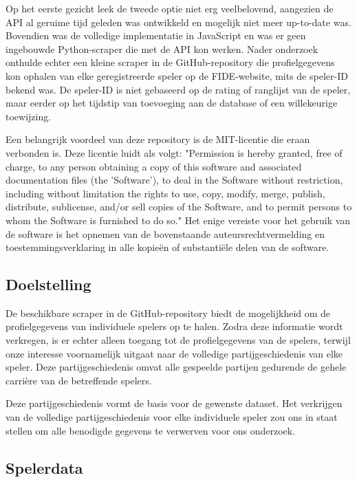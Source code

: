 Op het eerste gezicht leek de tweede optie niet erg veelbelovend, aangezien de API al geruime tijd geleden was ontwikkeld en mogelijk niet meer up-to-date was. Bovendien was de volledige implementatie in JavaScript en was er geen ingebouwde Python-scraper die met de API kon werken. Nader onderzoek onthulde echter een kleine scraper in de GitHub-repository die profielgegevens kon ophalen van elke geregistreerde speler op de FIDE-website, mits de speler-ID bekend was. De speler-ID is niet gebaseerd op de rating of ranglijst van de speler, maar eerder op het tijdstip van toevoeging aan de database of een willekeurige toewijzing.

Een belangrijk voordeel van deze repository is de MIT-licentie die eraan verbonden is. Deze licentie luidt als volgt: "Permission is hereby granted, free of charge, to any person obtaining a copy of this software and associated documentation files (the 'Software'), to deal in the Software without restriction, including without limitation the rights to use, copy, modify, merge, publish, distribute, sublicense, and/or sell copies of the Software, and to permit persons to whom the Software is furnished to do so." Het enige vereiste voor het gebruik van de software is het opnemen van de bovenstaande auteursrechtvermelding en toestemmingsverklaring in alle kopieën of substantiële delen van de software.

\subsection{Doelstelling}

De beschikbare scraper in de GitHub-repository biedt de mogelijkheid om de profielgegevens van individuele spelers op te halen. Zodra deze informatie wordt verkregen, is er echter alleen toegang tot de profielgegevens van de spelers, terwijl onze interesse voornamelijk uitgaat naar de volledige partijgeschiedenis van elke speler. Deze partijgeschiedenis omvat alle gespeelde partijen gedurende de gehele carrière van de betreffende spelers.

Deze partijgeschiedenis vormt de basis voor de gewenste dataset. Het verkrijgen van de volledige partijgeschiedenis voor elke individuele speler zou ons in staat stellen om alle benodigde gegevens te verwerven voor ons onderzoek.

\subsection{Spelerdata}

